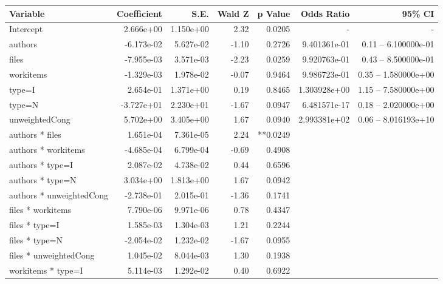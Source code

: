 \begin{table*}
\begin{center}
\begin{tabular}{lrrrrrr}
Variable & Coefficient & S.E. & Wald Z & p Value & Odds Ratio & 95\% CI \\
	\hline
Intercept                  &  2.666e+00  & 1.150e+00  &  2.32   & 0.0205 & - & - \\
authors                    & -6.173e-02  & 5.627e-02  & -1.10   & 0.2726 & 9.401361e-01 & 0.11 -- 6.100000e-01    \\
files                      & -7.955e-03  & 3.571e-03  & -2.23   & 0.0259 & 9.920763e-01 & 0.43 -- 8.500000e-01    \\
workitems                  & -1.329e-03  & 1.978e-02  & -0.07   & 0.9464 & 9.986723e-01 & 0.35 -- 1.580000e+00    \\
type=I                     &  2.654e-01  & 1.371e+00  &  0.19   & 0.8465 & 1.303928e+00 & 1.15 -- 7.580000e+00    \\
type=N                     & -3.727e+01  & 2.230e+01  & -1.67   & 0.0947 & 6.481571e-17 & 0.18 -- 2.020000e+00    \\
unweightedCong             &  5.702e+00  & 3.405e+00  &  1.67   & 0.0940 & 2.993381e+02 & 0.06 -- 8.016193e+10    \\
\hline
authors * files            &  1.651e-04  & 7.361e-05  &  2.24   & **0.0249 &              &  \\
authors * workitems        & -4.685e-04  & 6.799e-04  & -0.69   & 0.4908 &              &  \\
authors * type=I           &  2.087e-02  & 4.738e-02  &  0.44   & 0.6596 &              &  \\
authors * type=N           &  3.034e+00  & 1.813e+00  &  1.67   & 0.0942 &              &  \\
authors * unweightedCong   & -2.738e-01  & 2.015e-01  & -1.36   & 0.1741 &              &  \\
files * workitems          &  7.790e-06  & 9.971e-06  &  0.78   & 0.4347 &              &  \\
files * type=I             &  1.585e-03  & 1.304e-03  &  1.21   & 0.2244 &              &  \\
files * type=N             & -2.054e-02  & 1.232e-02  & -1.67   & 0.0955 &              &  \\
files * unweightedCong     &  1.045e-02  & 8.044e-03  &  1.30   & 0.1938 &              &  \\
workitems * type=I         &  5.114e-03  & 1.292e-02  &  0.40   & 0.6922 &              &  \\

\end{tabular}
\end{center}
\end{table*}
